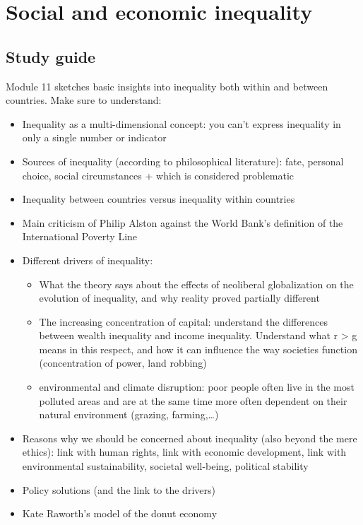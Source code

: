 \documentclass[../summary.tex]{subfiles}
\begin{document}
	
	\section{Social and economic inequality}
	
	\subsection{Study guide}
	
	Module 11 sketches basic insights into inequality both within and between countries. Make sure to understand:
	\begin{itemize}
		\item Inequality as a multi-dimensional concept: you can’t express inequality in only a single number or indicator
		\item Sources of inequality (according to philosophical literature): fate, personal choice, social circumstances + which is considered problematic
		\item Inequality between countries versus inequality within countries
		\item Main criticism of Philip Alston against the World Bank’s 
		definition of the International Poverty Line
		\item Different drivers of inequality:
		\begin{itemize}
			\item What the theory says about the effects of neoliberal globalization on the evolution of inequality, and why reality proved partially different
			\item The increasing concentration of capital: understand the differences between wealth inequality and income inequality. Understand what r > g means in this respect, and how it can influence the way societies function (concentration of power, land robbing)
			\item environmental and climate disruption: poor people often live in the most polluted areas and are at the same time more often dependent on their natural environment (grazing, farming,…)
		\end{itemize}
		\item Reasons why we should be concerned about inequality (also beyond the mere ethics): link with human rights, link with economic development, link with environmental sustainability, societal
		well-being, political stability
		\item Policy solutions (and the link to the drivers)
		\item Kate Raworth’s model of the donut economy 
	\end{itemize}
	
\end{document}
